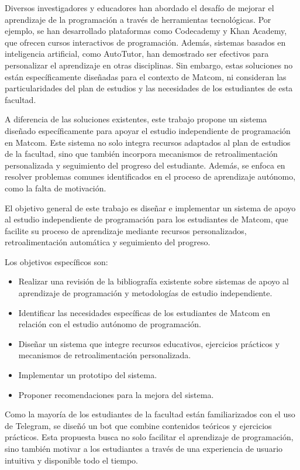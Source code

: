 \documentclass{article}
\begin{document}


Diversos investigadores y educadores han abordado el desafío de mejorar el aprendizaje de la programación a través de herramientas tecnológicas. Por ejemplo, se han desarrollado plataformas como Codecademy y Khan Academy, que ofrecen cursos interactivos de programación. Además, sistemas basados en inteligencia artificial, como AutoTutor, han demostrado ser efectivos para personalizar el aprendizaje en otras disciplinas. Sin embargo, estas soluciones no están específicamente diseñadas para el contexto de Matcom, ni consideran las particularidades del plan de estudios y las necesidades de los estudiantes de esta facultad.

A diferencia de las soluciones existentes, este trabajo propone un sistema diseñado específicamente para apoyar el estudio independiente de programación en Matcom. Este sistema no solo integra recursos adaptados al plan de estudios de la facultad, sino que también incorpora mecanismos de retroalimentación personalizada y seguimiento del progreso del estudiante. Además, se enfoca en resolver problemas comunes identificados en el proceso de aprendizaje autónomo, como la falta de motivación.

El objetivo general de este trabajo es diseñar e implementar un sistema de apoyo al estudio independiente de programación para los estudiantes de Matcom, que facilite su proceso de aprendizaje mediante recursos personalizados, retroalimentación automática y seguimiento del progreso.

Los objetivos específicos son:
\begin{itemize}
    \item Realizar una revisión de la bibliografía existente sobre sistemas de apoyo al aprendizaje de programación y metodologías de estudio independiente.
    \item Identificar las necesidades específicas de los estudiantes de Matcom en relación con el estudio autónomo de programación.
    \item Diseñar un sistema que integre recursos educativos, ejercicios prácticos y mecanismos de retroalimentación personalizada.
    \item Implementar un prototipo del sistema.
    \item Proponer recomendaciones para la mejora del sistema.
\end{itemize}

Como la mayoría de los estudiantes de la facultad están familiarizados con el uso de Telegram, se diseñó un bot que combine contenidos teóricos y ejercicios prácticos. Esta propuesta busca no solo facilitar el aprendizaje de programación, sino también motivar a los estudiantes a través de una experiencia de usuario intuitiva y disponible todo el tiempo.

\begin{thebibliography}{99}
  
\end{thebibliography}
\end{document}
